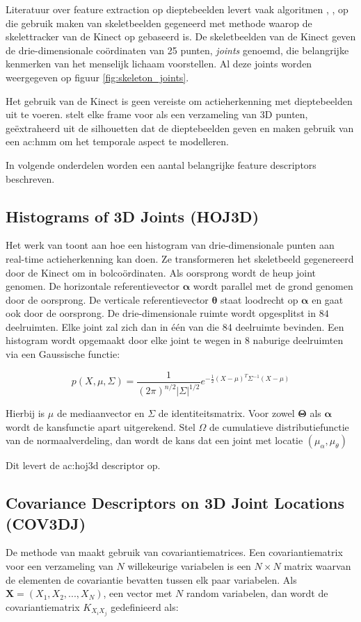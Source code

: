 Literatuur over feature extraction op dieptebeelden levert vaak algoritmen \cite{Xia2012}, \cite{Wang2012b}, \cite{Yang2012} op die gebruik maken van skeletbeelden gegeneerd met methode \cite{Shotton2011} waarop de skelettracker van de Kinect op gebaseerd is. De skeletbeelden van de Kinect geven de drie-dimensionale coördinaten van 25 punten, \textit{joints} genoemd, die belangrijke kenmerken van het menselijk lichaam voorstellen. Al deze joints worden weergegeven op figuur \ref{fig:skeleton_joints}.

Het gebruik van de Kinect is geen vereiste om actieherkenning met dieptebeelden uit te voeren. \cite{Li2010} stelt elke frame voor als een verzameling van 3D punten, geëxtraheerd uit de silhouetten dat de dieptebeelden geven en maken gebruik van een \gls{ac:hmm} om het temporale aspect te modelleren. \cite{Wang2012a} 

In volgende onderdelen worden een aantal belangrijke feature descriptors beschreven.
\subsection{Histograms of 3D Joints (HOJ3D)}
Het werk van \cite{Xia2012} toont aan hoe een histogram van drie-dimensionale punten aan real-time actieherkenning kan doen. Ze transformeren het skeletbeeld gegenereerd door de Kinect om in bolcoördinaten. Als oorsprong wordt de heup joint genomen. De horizontale referentievector $\mathbf{\alpha}$ wordt parallel met de grond genomen door de oorsprong. De verticale referentievector $\mathbf{\theta}$ staat loodrecht op $\mathbf{\alpha}$ en gaat ook door de oorsprong. De drie-dimensionale ruimte wordt opgesplitst in $84$ deelruimten. Elke joint zal zich dan in één van die 84 deelruimte bevinden. Een histogram wordt opgemaakt door elke joint te wegen in 8 naburige deelruimten via een Gaussische functie:

$$p(X, \mu, \Sigma) = \frac{1}{(2\pi)^{n/2}|\Sigma|^{1/2}}e^{-\frac{1}{2}(X - \mu)^T\Sigma^{-1}(X - \mu)}$$

Hierbij is $\mu$ de mediaanvector en $\Sigma$ de identiteitsmatrix. Voor zowel $\mathbf{\Theta}$ als $\mathbf{\alpha}$ wordt de kansfunctie apart uitgerekend. Stel $\Omega$ de cumulatieve distributiefunctie van de normaalverdeling, dan wordt de kans dat een joint met locatie $(\mu_\alpha, \mu_\theta)$ 


Dit levert de \gls{ac:hoj3d} descriptor op.



\subsection{Covariance Descriptors on 3D Joint Locations (COV3DJ)}
De methode van \cite{Hussein2013} maakt gebruik van covariantiematrices. Een covariantiematrix voor een verzameling van $N$ willekeurige variabelen is een $N \times N$ matrix waarvan de elementen de covariantie bevatten tussen elk paar variabelen. Als $\textbf{X} = (X_1, X_2, ..., X_N)$, een vector met $N$ random variabelen, dan wordt de covariantiematrix $K_{X_{i}X_{j}}$ gedefinieerd als:

